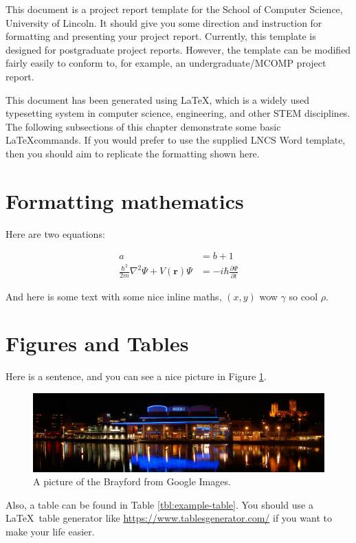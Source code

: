 This document is a project report template for the School of Computer Science, University of Lincoln. It should give you some direction and instruction for formatting and presenting your project report. Currently, this template is designed for postgraduate project reports. However, the template can be modified fairly easily to conform to, for example, an undergraduate/MCOMP project report.

This document has been generated using \LaTeX, which is a widely used typesetting system in computer science, engineering, and other STEM disciplines. The following subsections of this chapter demonstrate some basic \LaTeX commands. If you would prefer to use the supplied LNCS Word template, then you should aim to replicate the formatting shown here.

\section{Formatting mathematics}
Here are two equations:

\begin{align}
a &= b + 1 \\
\frac{\hbar^2}{2m}\nabla^2\Psi + V(\mathbf{r})\Psi
&= -i\hbar \frac{\partial\Psi}{\partial t}    
\end{align}


And here is some text with some nice inline maths, $(x, y)$ wow $\gamma$ so cool $\rho$.

\section{Figures and Tables}

Here is a sentence, and you can see a nice picture in Figure \ref{fig:brayford}.

\begin{figure}[h]
    \centering
    \includegraphics[width=\textwidth]{figures/brayford.jpg}
    \caption{A picture of the Brayford from Google Images.}
    \label{fig:brayford}
\end{figure}

Also, a table can be found in Table \ref{tbl:example-table}. You should use a \LaTeX~table generator like \url{https://www.tablesgenerator.com/} if you want to make your life easier.

